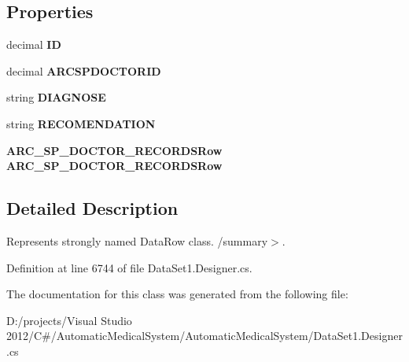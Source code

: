 \subsection*{Properties}
\begin{CompactItemize}
\item 
decimal \textbf{ID}\hspace{0.3cm}{\tt  [get, set]}\label{class_automatic_medical_system_1_1_data_set1_1_1_d_i_a_g_n_o_s_e___s_p___d_o_c_t_o_r_row_0e0d00140d29ca1f628f9e100dded94c}

\item 
decimal \textbf{ARCSPDOCTORID}\hspace{0.3cm}{\tt  [get, set]}\label{class_automatic_medical_system_1_1_data_set1_1_1_d_i_a_g_n_o_s_e___s_p___d_o_c_t_o_r_row_07417c3d72d88c085d258c6c3d4267dc}

\item 
string \textbf{DIAGNOSE}\hspace{0.3cm}{\tt  [get, set]}\label{class_automatic_medical_system_1_1_data_set1_1_1_d_i_a_g_n_o_s_e___s_p___d_o_c_t_o_r_row_0e6f79871062a0b624a98412dc365c0e}

\item 
string \textbf{RECOMENDATION}\hspace{0.3cm}{\tt  [get, set]}\label{class_automatic_medical_system_1_1_data_set1_1_1_d_i_a_g_n_o_s_e___s_p___d_o_c_t_o_r_row_b896a2f1aac1b877ee0fc8c5a18a5c11}

\item 
{\bf ARC\_\-SP\_\-DOCTOR\_\-RECORDSRow} \textbf{ARC\_\-SP\_\-DOCTOR\_\-RECORDSRow}\hspace{0.3cm}{\tt  [get, set]}\label{class_automatic_medical_system_1_1_data_set1_1_1_d_i_a_g_n_o_s_e___s_p___d_o_c_t_o_r_row_0bd61f0c6c541e53b6af749e6fed82e3}

\end{CompactItemize}


\subsection{Detailed Description}
Represents strongly named DataRow class. /summary$>$. 

Definition at line 6744 of file DataSet1.Designer.cs.

The documentation for this class was generated from the following file:\begin{CompactItemize}
\item 
D:/projects/Visual Studio 2012/C\#/AutomaticMedicalSystem/AutomaticMedicalSystem/DataSet1.Designer.cs\end{CompactItemize}
